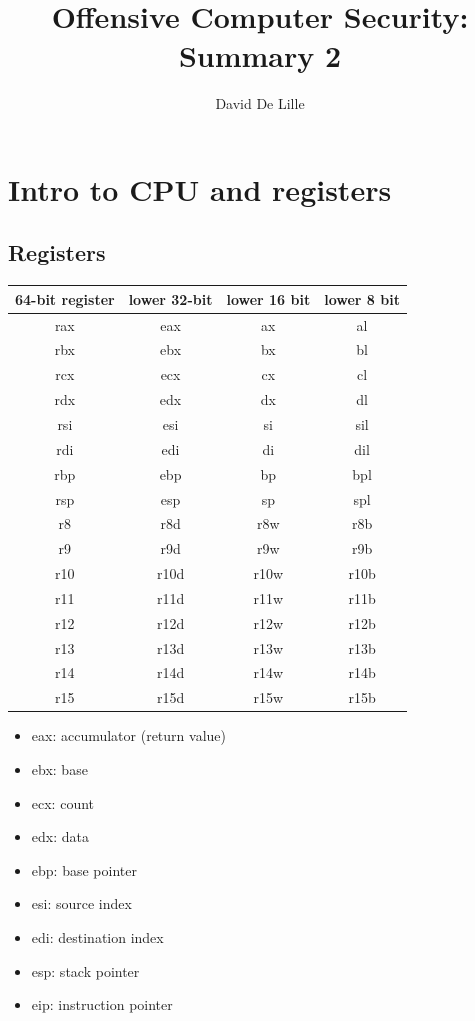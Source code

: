 \documentclass[letterpaper]{article}
\author{David De Lille}
\title{Offensive Computer Security: Summary 2}
\begin{document}
\maketitle

\section{Intro to CPU and registers}
\subsection{Registers}

\begin{center}
\begin{tabular}{cccc}
64-bit register & lower 32-bit & lower 16 bit & lower 8 bit\\
\hline
rax & eax & ax & al\\
rbx & ebx & bx & bl\\
rcx & ecx & cx & cl\\
rdx & edx & dx & dl\\
rsi & esi & si & sil\\
rdi & edi & di & dil\\
rbp & ebp & bp & bpl\\
rsp & esp & sp & spl\\
r8 & r8d & r8w & r8b\\
r9 & r9d & r9w & r9b\\
r10 & r10d & r10w & r10b\\
r11 & r11d & r11w & r11b\\
r12 & r12d & r12w & r12b\\
r13 & r13d & r13w & r13b\\
r14 & r14d & r14w & r14b\\
r15 & r15d & r15w & r15b
\end{tabular}
\end{center}

\begin{multicols}{2}
\begin{itemize}
\item eax: accumulator (return value)
\item ebx: base
\item ecx: count
\item edx: data
\item ebp: base pointer
\item esi: source index
\item edi: destination index
\item esp: stack pointer
\item eip: instruction pointer
\end{itemize}
\end{multicols}
\end{document}
